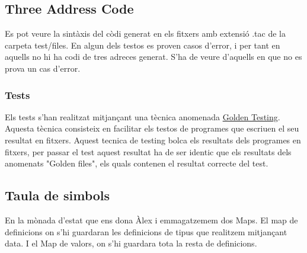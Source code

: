 \documentclass{article}
\begin{document}
\subsection{Three Address Code}
Es pot veure la sintàxis del còdi generat en els fitxers amb extensió
.tac de la carpeta test/files. En algun dels testos es proven casos d'error, i per tant en aquells no hi ha codi de tres adreces generat. S'ha de veure d'aquells en que no es prova un cas d'error.
\subsubsection{Tests}
Els tests s'han realitzat mitjançant una tècnica anomenada \href{https://hackage.haskell.org/package/tasty-golden}{Golden Testing}. Aquesta tècnica consisteix en facilitar els testos de programes que escriuen el seu resultat en fitxers. Aquest tecnica de testing bolca els resultats dels programes en fitxers, per passar el test aquest resultat ha de ser identic que els resultats dels anomenats "Golden files", els quals contenen el resultat correcte del test. 
\subsection{Taula de simbols}
En la mònada d'estat que ens dona Àlex i emmagatzemem dos Maps. El map
de definicions on s'hi guardaran les definicions de tipus que realitzem
mitjançant data. I el Map de valors, on s'hi guardara tota la resta de
definicions.
\end{document}
